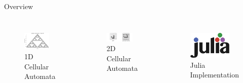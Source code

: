 \begin{frame}{Overview}
    \begin{columns}[b]
        \begin{figure}
            \centering
            \includegraphics[width=0.8\textwidth]{../paper/figures/rule90}\\
            1D Cellular Automata
        \end{figure}
        \begin{figure}
            \centering
            \includegraphics[width=0.8\textwidth]{../paper/figures/spaceship}\\
            2D Cellular Automata
        \end{figure}
        \begin{figure}
            \centering
            \includegraphics[width=0.8\textwidth]{../paper/figures/julia}\\
            Julia Implementation\footnotemark
        \end{figure}
    \end{columns}
\end{frame}


